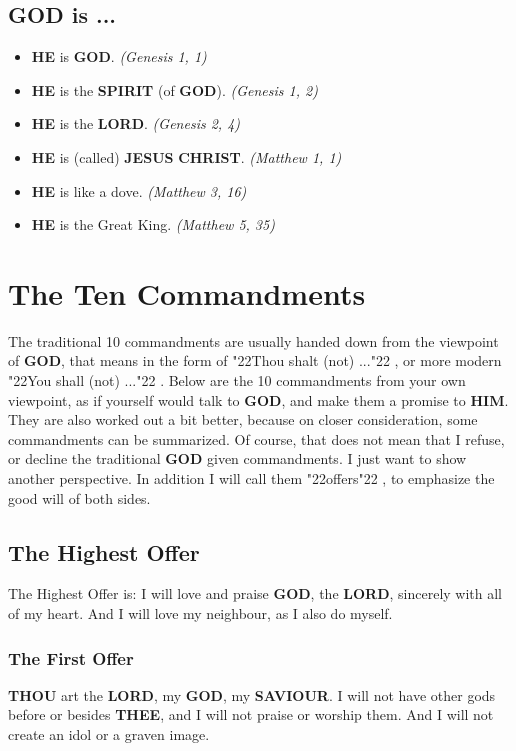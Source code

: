 \documentclass[10pt,a5paper]{article}
\newcommand{\Christ}[0]{\textbf{CHRIST}}
\newcommand{\God}[0]{\textbf{GOD}}
\newcommand{\He}[0]{\textbf{HE}}
\newcommand{\Him}[0]{\textbf{HIM}}
\newcommand{\Jesus}[0]{\textbf{JESUS}}
\newcommand{\Lord}[0]{\textbf{LORD}}
\newcommand{\Saviour}[0]{\textbf{SAVIOUR}}
\newcommand{\Spirit}[0]{\textbf{SPIRIT}}
\newcommand{\Thee}[0]{\textbf{THEE}}
\newcommand{\Thou}[0]{\textbf{THOU}}
\newcommand{\q}[1]{\char"22{#1}\char"22 }
\begin{document}
	\subsection{{\God} is ...}
		\begin{itemize}[nosep]
			\item {\He} is {\God}. \textit{(Genesis 1, 1)}
			\item {\He} is the {\Spirit} (of {\God}). \textit{(Genesis 1, 2)}
			\item {\He} is the {\Lord}. \textit{(Genesis 2, 4)}
			\item {\He} is (called) {\Jesus} {\Christ}. \textit{(Matthew 1, 1)}
			\item {\He} is like a dove. \textit{(Matthew 3, 16)}
			\item {\He} is the Great King. \textit{(Matthew 5, 35)}
		\end{itemize}

	\newpage
	\section{The Ten Commandments}
		The traditional 10 commandments are usually handed down from the viewpoint of {\God},
		that means in the form of \q{Thou shalt (not) ...},
		or more modern \q{You shall (not) ...}.
		Below are the 10 commandments from your own viewpoint,
		as if yourself would talk to {\God},
		and make them a promise to {\Him}.
		They are also worked out a bit better,
		because on closer consideration,
		some commandments can be summarized.
		Of course,
		that does not mean that I refuse,
		or decline the traditional {\God} given commandments.
		I just want to show another perspective.
		In addition I will call them \q{offers},
		to emphasize the good will of both sides.
	
	\subsection{The Highest Offer}
		The Highest Offer is:
		I will love and praise {\God},
		the {\Lord},
		sincerely with all of my heart.
		And I will love my neighbour,
		as I also do myself.
		
	\subsubsection{The First Offer}
		{\Thou} art the {\Lord},
		my {\God},
		my {\Saviour}.
		I will not have other gods before or besides {\Thee},
		and I will not praise or worship them.
		And I will not create an idol or a graven image.
		
\end{document}
